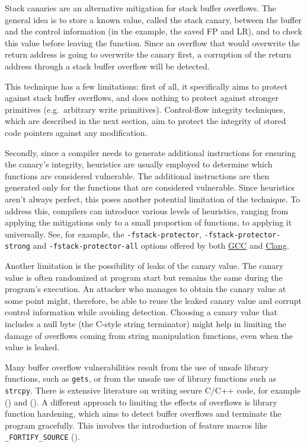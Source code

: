 \documentclass[
  a4paper,
]{report}
\begin{document}
Stack canaries are an alternative mitigation for stack buffer overflows.
The general idea is to store a known value, called the stack canary,
between the buffer and the control information (in the example, the
saved FP and LR), and to check this value before leaving the function.
Since an overflow that would overwrite the return address is going to
overwrite the canary first, a corruption of the return address through a
stack buffer overflow will be detected.

This technique has a few limitations: first of all, it specifically aims
to protect against stack buffer overflows, and does nothing to protect
against stronger primitives (e.g.~arbitrary write primitives).
Control-flow integrity techniques, which are described in the next
section, aim to protect the integrity of stored code pointers against
any modification.

Secondly, since a compiler needs to generate additional instructions for
ensuring the canary's integrity, heuristics are usually employed to
determine which functions are considered vulnerable. The additional
instructions are then generated only for the functions that are
considered vulnerable. Since heuristics aren't always perfect, this
poses another potential limitation of the technique. To address this,
compilers can introduce various levels of heuristics, ranging from
applying the mitigations only to a small proportion of functions, to
applying it universally. See, for example, the
\texttt{-fstack-protector}, \texttt{-fstack-protector-strong} and
\texttt{-fstack-protector-all} options offered by both
\href{https://gcc.gnu.org/onlinedocs/gcc/Instrumentation-Options.html}{GCC}
and
\href{https://clang.llvm.org/docs/ClangCommandLineReference.html\#cmdoption-clang-fstack-protector}{Clang}.

Another limitation is the possibility of leaks of the canary value. The
canary value is often randomized at program start but remains the same
during the program's execution. An attacker who manages to obtain the
canary value at some point might, therefore, be able to reuse the leaked
canary value and corrupt control information while avoiding detection.
Choosing a canary value that includes a null byte (the C-style string
terminator) might help in limiting the damage of overflows coming from
string manipulation functions, even when the value is leaked.

Many buffer overflow vulnerabilities result from the use of unsafe
library functions, such as \texttt{gets}, or from the unsafe use of
library functions such as \texttt{strcpy}. There is extensive literature
on writing secure C/C++ code, for example
() and
(). A different
approach to limiting the effects of overflows is library function
hardening, which aims to detect buffer overflows and terminate the
program gracefully. This involves the introduction of feature macros
like \texttt{\_FORTIFY\_SOURCE} ().
\end{document}
